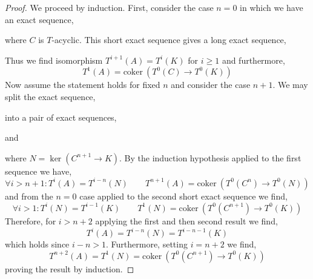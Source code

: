 \documentclass[12pt]{extarticle}
\newcommand{\coker}[1]{\mathrm{coker}\: #1}
\theoremstyle{definition}
\begin{document}
\begin{proof}
We proceed by induction. First, consider the case $n = 0$ in which we have an exact sequence,
\begin{center}
\end{center}
where $C$ is $T$-acyclic. This short exact sequence gives a long exact sequence,
\begin{center}
\end{center}
Thus we find isomorphism $T^{i + 1}(A) = T^i(K)$ for $i \ge 1$ and furthermore,
\[ T^1(A) = \coker{(T^0(C) \to T^0(K))} \]
Now assume the statement holds for fixed $n$ and consider the case $n + 1$. We may split the exact sequence,
\begin{center}
\end{center}
into a pair of exact sequences,
\begin{center}
\end{center}
and 
\begin{center}
\end{center}
where $N = \ker{(C^{n+1} \to K)}$. By the induction hypothesis applied to the first sequence we have,
\[ \forall i > n + 1 : T^{i}(A) = T^{i - n}(N) \quad \quad T^{n+1}(A) = \coker{(T^0(C^n) \to T^0(N))} \] 
and from the $n = 0$ case applied to the second short exact sequence we find,
\[ \forall i > 1 : T^i(N) = T^{i - 1}(K) \quad \quad T^{1}(N) = \coker{(T^0(C^{n+1}) \to T^0(K))} \] 
Therefore, for $i > n + 2$ applying the first and then second result we find,
\[ T^i(A) = T^{i - n}(N) = T^{i - n - 1}(K) \]
which holds since $i - n > 1$. Furthermore, setting $i = n + 2$ we find,
\[ T^{n + 2}(A) = T^{1}(N) = \coker{(T^0(C^{n+1}) \to T^0(K))} \]
proving the result by induction.
\end{proof}
\end{document}
